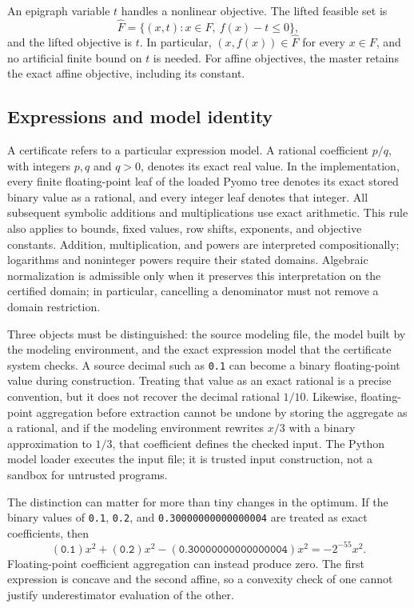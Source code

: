 An epigraph variable $t$ handles a nonlinear objective. The lifted feasible set is
\begin{equation}
 \widehat F=\{(x,t):x\in F,\ f(x)-t\leq0\},
 \label{eq:epigraph}
\end{equation}
and the lifted objective is $t$. In particular, $(x,f(x))\in\widehat F$ for every $x\in F$, and no artificial finite bound on $t$ is needed. For affine objectives, the master retains the exact affine objective, including its constant.

\subsection{Expressions and model identity}
\label{sec:semantics}
A certificate refers to a particular expression model. A rational coefficient $p/q$, with integers $p,q$ and $q>0$, denotes its exact real value. In the implementation, every finite floating-point leaf of the loaded Pyomo tree denotes its exact stored binary value as a rational, and every integer leaf denotes that integer. All subsequent symbolic additions and multiplications use exact arithmetic. This rule also applies to bounds, fixed values, row shifts, exponents, and objective constants. Addition, multiplication, and powers are interpreted compositionally; logarithms and noninteger powers require their stated domains. Algebraic normalization is admissible only when it preserves this interpretation on the certified domain; in particular, cancelling a denominator must not remove a domain restriction.

Three objects must be distinguished: the source modeling file, the model built by the modeling environment, and the exact expression model that the certificate system checks. A source decimal such as \texttt{0.1} can become a binary floating-point value during construction. Treating that value as an exact rational is a precise convention, but it does not recover the decimal rational $1/10$. Likewise, floating-point aggregation before extraction cannot be undone by storing the aggregate as a rational, and if the modeling environment rewrites $x/3$ with a binary approximation to $1/3$, that coefficient defines the checked input. The Python model loader executes the input file; it is trusted input construction, not a sandbox for untrusted programs.

The distinction can matter for more than tiny changes in the optimum. If the binary values of \texttt{0.1}, \texttt{0.2}, and \texttt{0.30000000000000004} are treated as exact coefficients, then
\begin{equation}
 (\texttt{0.1})x^2+(\texttt{0.2})x^2
 -(\texttt{0.30000000000000004})x^2=-2^{-55}x^2.
 \label{eq:folding-example}
\end{equation}
Floating-point coefficient aggregation can instead produce zero. The first expression is concave and the second affine, so a convexity check of one cannot justify underestimator evaluation of the other.

